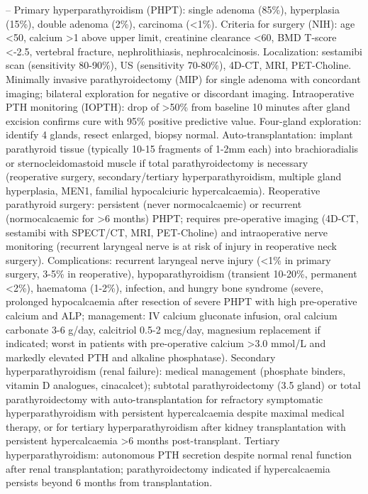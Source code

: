 -- Primary hyperparathyroidism (PHPT): single adenoma (85\%), hyperplasia (15\%), double adenoma (2\%), carcinoma (<1\%). Criteria for surgery (NIH): age <50, calcium >1 above upper limit, creatinine clearance <60, BMD T-score <-2.5, vertebral fracture, nephrolithiasis, nephrocalcinosis. Localization: sestamibi scan (sensitivity 80-90\%), US (sensitivity 70-80\%), 4D-CT, MRI, PET-Choline. Minimally invasive parathyroidectomy (MIP) for single adenoma with concordant imaging; bilateral exploration for negative or discordant imaging. Intraoperative PTH monitoring (IOPTH): drop of >50\% from baseline 10 minutes after gland excision confirms cure with 95\% positive predictive value. Four-gland exploration: identify 4 glands, resect enlarged, biopsy normal. Auto-transplantation: implant parathyroid tissue (typically 10-15 fragments of 1-2mm each) into brachioradialis or sternocleidomastoid muscle if total parathyroidectomy is necessary (reoperative surgery, secondary/tertiary hyperparathyroidism, multiple gland hyperplasia, MEN1, familial hypocalciuric hypercalcaemia). Reoperative parathyroid surgery: persistent (never normocalcaemic) or recurrent (normocalcaemic for >6 months) PHPT; requires pre-operative imaging (4D-CT, sestamibi with SPECT/CT, MRI, PET-Choline) and intraoperative nerve monitoring (recurrent laryngeal nerve is at risk of injury in reoperative neck surgery). Complications: recurrent laryngeal nerve injury (<1\% in primary surgery, 3-5\% in reoperative), hypoparathyroidism (transient 10-20\%, permanent <2\%), haematoma (1-2\%), infection, and hungry bone syndrome (severe, prolonged hypocalcaemia after resection of severe PHPT with high pre-operative calcium and ALP; management: IV calcium gluconate infusion, oral calcium carbonate 3-6 g/day, calcitriol 0.5-2 mcg/day, magnesium replacement if indicated; worst in patients with pre-operative calcium >3.0 mmol/L and markedly elevated PTH and alkaline phosphatase). Secondary hyperparathyroidism (renal failure): medical management (phosphate binders, vitamin D analogues, cinacalcet); subtotal parathyroidectomy (3.5 gland) or total parathyroidectomy with auto-transplantation for refractory symptomatic hyperparathyroidism with persistent hypercalcaemia despite maximal medical therapy, or for tertiary hyperparathyroidism after kidney transplantation with persistent hypercalcaemia >6 months post-transplant. Tertiary hyperparathyroidism: autonomous PTH secretion despite normal renal function after renal transplantation; parathyroidectomy indicated if hypercalcaemia persists beyond 6 months from transplantation.

